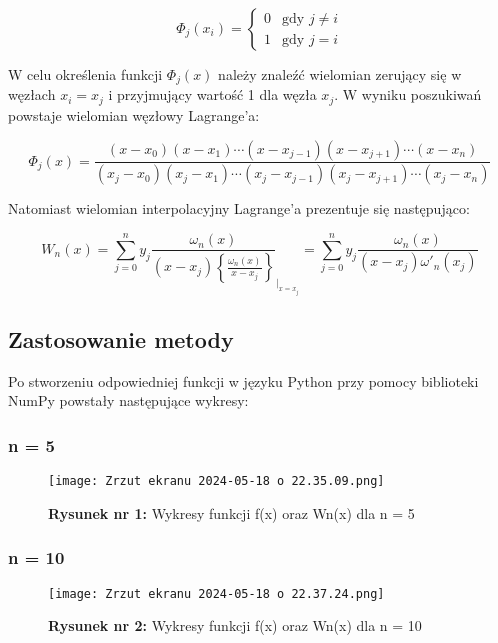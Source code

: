 \documentclass{article}
\begin{document}
\begin{equation*}
\Phi_j(x_i) = \begin{cases}
0 & \text{gdy } j \neq i \\
1 & \text{gdy } j = i
\end{cases}
\end{equation*}

W celu określenia funkcji $\Phi_j(x)$ należy znaleźć wielomian zerujący się w węzłach $x_i = x_j$ i przyjmujący wartość 1 dla węzła $x_j$. W wyniku poszukiwań powstaje wielomian węzłowy Lagrange'a:


\begin{equation*}
\Phi_j(x) = \frac{(x - x_0)(x - x_1) \cdots (x - x_{j-1})(x - x_{j+1}) \cdots (x - x_n)}
{(x_j - x_0)(x_j - x_1) \cdots (x_j - x_{j-1})(x_j - x_{j+1}) \cdots (x_j - x_n)}
\end{equation*}

Natomiast wielomian interpolacyjny Lagrange'a prezentuje się następująco:

\begin{equation*}
W_n(x) = \sum_{j=0}^{n} y_j \frac{\omega_n(x)}{(x - x_j) \left\{ \frac{\omega_n(x)}{x - x_j} \right\}}_{\bigg|_{x = x_j}}
= \sum_{j=0}^{n} y_j \frac{\omega_n(x)}{(x - x_j) \omega'_n(x_j)}
\end{equation*}

\subsection{Zastosowanie metody}

Po stworzeniu odpowiedniej funkcji w języku Python przy pomocy biblioteki NumPy powstały następujące wykresy:

\subsubsection{n = 5}

\begin{figure}[H]
    \centering
    \texttt{[image: Zrzut ekranu 2024-05-18 o 22.35.09.png]}
    \caption{\textbf{Rysunek nr 1: } Wykresy funkcji f(x) oraz Wn(x) dla n = 5}
    \label{fig:enter-label}
\end{figure}

\subsubsection{n = 10}

\begin{figure}[H]
    \centering
    \texttt{[image: Zrzut ekranu 2024-05-18 o 22.37.24.png]}
    \caption{\textbf{Rysunek nr 2: }Wykresy funkcji f(x) oraz Wn(x) dla n = 10}
    \label{fig:enter-label}
\end{figure}
\end{document}
